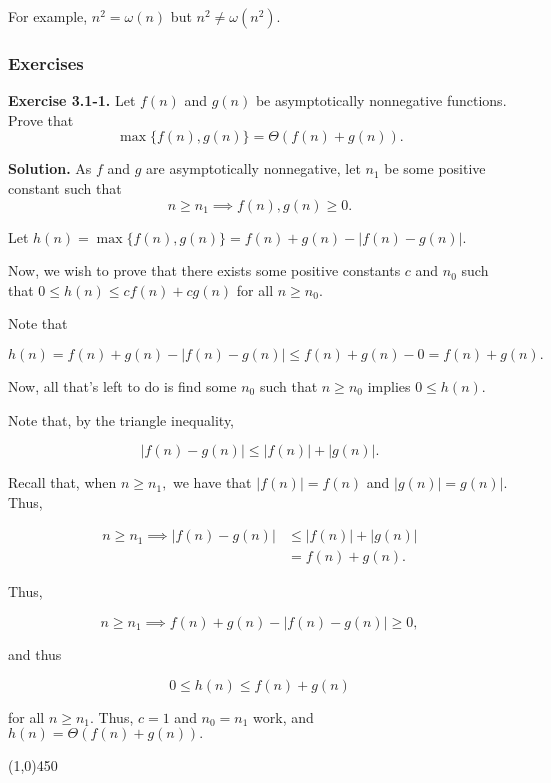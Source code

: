 \documentclass{article}
\newcommand{\exec}[2]
{\textbf{Exercise #1.} #2

\textbf{Solution.}}
\newcommand{\bardiv}{\begin{center}
\line(1,0){450}
\end{center}}
\begin{document}
\vspace{5mm}

For example, $n^2 = \omega(n)$ but $n^2 \neq \omega(n^2).$

\subsubsection{Exercises}

\exec{3.1-1}{Let $f(n)$ and $g(n)$ be asymptotically nonnegative functions. Prove that $$\max\{ f(n), g(n) \} = \Theta(f(n) + g(n)).$$}
As $f$ and $g$ are asymptotically nonnegative, let $n_1$ be some positive constant such that $$n \geq n_1 \implies f(n), g(n) \geq 0.$$

Let $h(n) = \max\{f(n), g(n)\} = f(n) + g(n) - |f(n) - g(n)|.$

Now, we wish to prove that there exists some positive constants $c$ and $n_0$ such that $0 \leq h(n) \leq cf(n) + cg(n)$ for all $n \geq n_0.$

Note that

$$h(n) = f(n) + g(n) - |f(n) - g(n)| \leq f(n) + g(n) - 0 = f(n) + g(n).$$

Now, all that's left to do is find some $n_0$ such that $n \geq n_0$ implies $0 \leq h(n).$

Note that, by the triangle inequality,

$$|f(n) - g(n)| \leq |f(n)| + |g(n)|.$$

Recall that, when $n \geq n_1,$ we have that $|f(n)| = f(n)$ and $|g(n)| = g(n)|.$ Thus,

\begin{align*}
	n \geq n_1 \implies |f(n) - g(n)| &\leq |f(n)| + |g(n)| \\
					  &= f(n) + g(n).
\end{align*}

Thus, 

$$n \geq n_1 \implies f(n) + g(n) - |f(n) - g(n)| \geq 0,$$

and thus

$$0 \leq h(n) \leq f(n) + g(n)$$ 

for all $n \geq n_1.$ Thus, $c=1$ and $n_0 = n_1$ work, and $h(n) = \Theta(f(n) + g(n)).$

\bardiv
\end{document}
